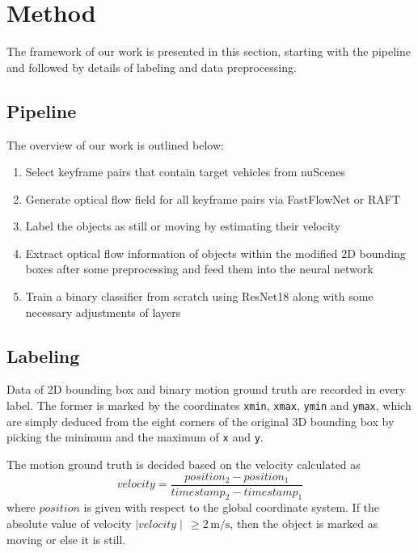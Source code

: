\documentclass[10pt, a4paper, twocolumn]{article}
\begin{document}
    
\section{\large Method}

    The framework of our work is presented in this section, starting with the pipeline and followed by details of labeling and data preprocessing.

\subsection{\normalsize Pipeline}

    The overview of our work is outlined below:
    
    \begin{enumerate}[noitemsep, topsep=0pt]
        \item Select keyframe pairs that contain target vehicles from nuScenes
        \item Generate optical flow field for all keyframe pairs via FastFlowNet or RAFT
        \item Label the objects as still or moving by estimating their velocity  
        \item Extract optical flow information of objects within the modified 2D bounding boxes after some preprocessing and feed them into the neural network
        \item Train a binary classifier from scratch using ResNet18 along with some necessary adjustments of layers
    \end{enumerate}
    
\subsection{\normalsize Labeling}

    Data of 2D bounding box and binary motion ground truth are recorded in every label. The former is marked by the coordinates \texttt{xmin}, \texttt{xmax}, \texttt{ymin} and \texttt{ymax}, which are simply deduced from the eight corners of the original 3D bounding box by picking the minimum and the maximum of \texttt{x} and \texttt{y}. 
    
    The motion ground truth is decided based on the velocity calculated as
    \begin{equation}
        velocity = \frac{position_{2} - position_{1}}{timestamp_{2} - timestamp_{1}}
    \end{equation}
    where $position$ is given with respect to the global coordinate system. If the absolute value of velocity $\mid velocity \mid \, \geq 2 \, \textrm{m/s} $, then the object is marked as moving or else it is still.  
\end{document}
